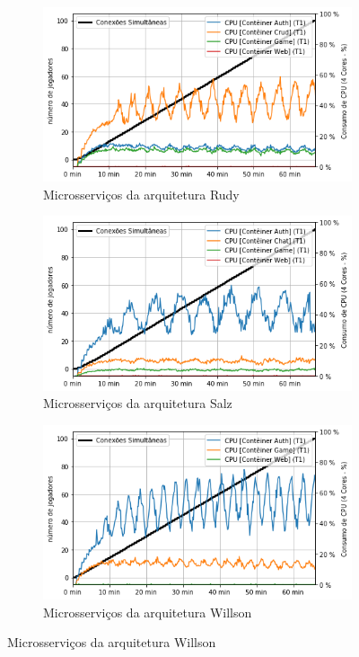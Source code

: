 \begin{figure}[htb!]
    \caption{Consumo de \ac{cpu} dos microsserviços}
    \label{fig:experimento_game_cpu}

    \begin{subfigure}{0.5\textwidth}
        \centering
        \includegraphics[width=.95\linewidth]{figuras/testes/r_cpu_game.png}
        \caption{Microsserviços da arquitetura Rudy}
        \label{fig:r_cpu_game}
    \end{subfigure}%
    \begin{subfigure}{0.5\textwidth}
        \centering
        \includegraphics[width=.95\linewidth]{figuras/testes/s_cpu_game.png}
        \caption{Microsserviços da arquitetura Salz}
        \label{fig:s_cpu_game}
    \end{subfigure}

    \begin{subfigure}{0.5\textwidth}
        \centering
        \includegraphics[width=.95\linewidth]{figuras/testes/w_cpu_game.png}
        \caption{Microsserviços da arquitetura Willson}
        \label{fig:w_cpu_game}
    \end{subfigure}%


\end{figure}
